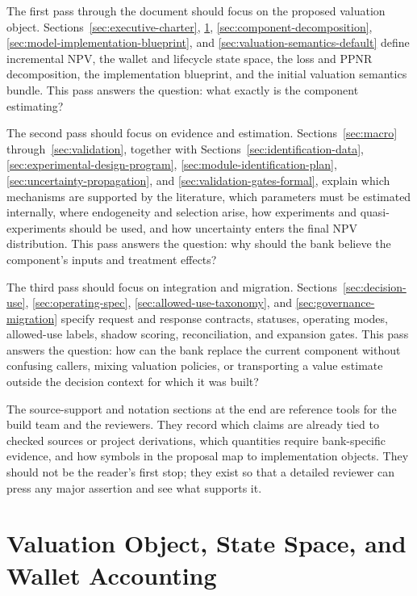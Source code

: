 \documentclass[11pt]{article}
\newcommand{\1}{\mathbf{1}}
\begin{document}
The first pass through the document should focus on the proposed valuation
object. Sections~\ref{sec:executive-charter}, \ref{sec:valuation-spine},
\ref{sec:component-decomposition}, \ref{sec:model-implementation-blueprint},
and \ref{sec:valuation-semantics-default} define incremental NPV, the wallet
and lifecycle state space, the loss and PPNR decomposition, the implementation
blueprint, and the initial valuation semantics bundle. This pass answers the
question: what exactly is the component estimating?

The second pass should focus on evidence and estimation. Sections~\ref{sec:macro}
through~\ref{sec:validation}, together with
Sections~\ref{sec:identification-data},
\ref{sec:experimental-design-program},
\ref{sec:module-identification-plan}, \ref{sec:uncertainty-propagation}, and
\ref{sec:validation-gates-formal}, explain which mechanisms are supported by
the literature, which parameters must be estimated internally, where
endogeneity and selection arise, how experiments and quasi-experiments should
be used, and how uncertainty enters the final NPV distribution. This pass
answers the question: why should the bank believe the component's inputs and
treatment effects?

The third pass should focus on integration and migration.
Sections~\ref{sec:decision-use}, \ref{sec:operating-spec},
\ref{sec:allowed-use-taxonomy}, and \ref{sec:governance-migration} specify
request and response contracts, statuses, operating modes, allowed-use labels,
shadow scoring, reconciliation, and expansion gates. This pass answers the
question: how can the bank replace the current component without confusing
callers, mixing valuation policies, or transporting a value estimate outside
the decision context for which it was built?

The source-support and notation sections at the end are reference tools for
the build team and the reviewers. They record which claims are already tied to
checked sources or project derivations, which quantities require bank-specific
evidence, and how symbols in the proposal map to implementation objects. They
should not be the reader's first stop; they exist so that a detailed reviewer
can press any major assertion and see what supports it.

\section{Valuation Object, State Space, and Wallet Accounting}
\label{sec:valuation-spine}
\end{document}
